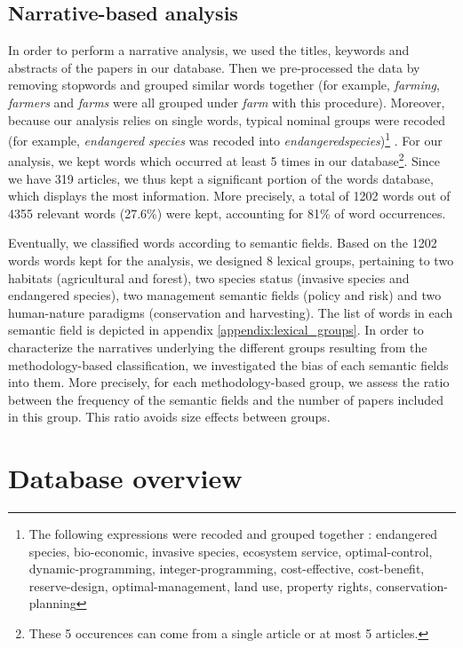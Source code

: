 \subsection{Narrative-based analysis}

In order to perform a narrative analysis, we used the titles, keywords and abstracts of the papers in our database.
Then we pre-processed the data by removing stopwords and grouped similar words together (for example, \textit{farming}, \textit{farmers} and \textit{farms} were all grouped under \textit{farm} with this procedure). Moreover, because our analysis relies on single words, typical nominal groups were recoded (for example, \textit{endangered species} was recoded into \textit{endangeredspecies})\footnote{The following expressions were recoded and grouped together : endangered species, bio-economic, invasive species, ecosystem service, optimal-control, dynamic-programming, integer-programming, cost-effective, cost-benefit, reserve-design, optimal-management, land use, property rights, conservation-planning} .
%
For our analysis, we kept words which occurred at least 5 times in our database\footnote{These 5 occurences can come from a single article or at most 5 articles.}. Since we have 319 articles, we thus kept a significant portion of the words database, which displays the most information. More precisely, a total of 1202 words out of 4355 relevant words (27.6\%) were kept, accounting for 81\% of word occurrences.

Eventually, we classified words according to semantic fields. Based on the 1202 words words kept for the analysis, we designed 8 lexical groups, pertaining to two habitats (agricultural and forest), two species status (invasive species and endangered species), two management semantic fields (policy and risk) and two human-nature paradigms (conservation and harvesting). The list of words in each semantic field is depicted in appendix \ref{appendix:lexical_groups}. 
In order to characterize the narratives underlying the different groups resulting from the methodology-based classification, we investigated the bias of each semantic fields into them. More precisely, for each methodology-based group, we assess the ratio between the frequency of the semantic fields and the number of papers included in this group. This ratio avoids size effects between groups.





\section{Database overview}

